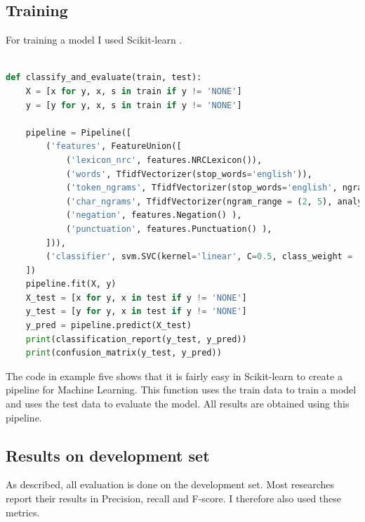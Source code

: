 \documentclass[11pt]{article}
\begin{document}
\subsection{Training}
For training a model I used Scikit-learn \cite{scikit-learn}. 
\begin{lstlisting}[language=python, caption=Training a emotion classifier, label=trainmodel_py]

def classify_and_evaluate(train, test):
    X = [x for y, x, s in train if y != 'NONE']
    y = [y for y, x, s in train if y != 'NONE']

    pipeline = Pipeline([
        ('features', FeatureUnion([
            ('lexicon_nrc', features.NRCLexicon()),
            ('words', TfidfVectorizer(stop_words='english')),
            ('token_ngrams', TfidfVectorizer(stop_words='english', ngram_range = (2, 5))),
            ('char_ngrams', TfidfVectorizer(ngram_range = (2, 5), analyzer = 'char')),
            ('negation', features.Negation() ),  
            ('punctuation', features.Punctuation() ),  
        ])),
        ('classifier', svm.SVC(kernel='linear', C=0.5, class_weight = 'balanced'))
    ])
    pipeline.fit(X, y)
    X_test = [x for y, x in test if y != 'NONE']
    y_test = [y for y, x in test if y != 'NONE']
    y_pred = pipeline.predict(X_test)
    print(classification_report(y_test, y_pred))
    print(confusion_matrix(y_test, y_pred))
\end{lstlisting}
The code in example five shows that it is fairly easy in Scikit-learn to create a pipeline for Machine Learning. This function uses the train data to train a model and uses the test data to evaluate the model. All results are obtained using this pipeline.

\subsection{Results on development set}
As described, all evaluation is done on the development set. Most researches report their results in Precision, recall and F-score. I therefore also used these metrics. 
\end{document}
